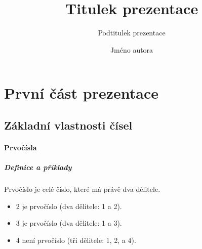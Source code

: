 \documentclass[color]{fithesis3}
\title{Titulek prezentace}
\subtitle{Podtitulek prezentace}
\author{Jméno autora}
\let\subsection\section
\let\section\chapter
\let\tableofcontents\relax}
\begin{document}
    \frame{\maketitle}
    \frame{\tableofcontents}

    \section{První část prezentace}
    \subsection{Základní vlastnosti čísel}
    \begin{frame}
        \frametitle{Prvočísla}
        \framesubtitle{Definice a příklady}
        
        \begin{definition}
            \alert{Prvočíslo} je celé číslo, které má právě dva dělitele.
        \end{definition}
        \begin{example}
            \begin{itemize}
                \item 2 je prvočíslo (dva dělitele: 1 a 2).
                \item 3 je prvočíslo (dva dělitele: 1 a 3).
                \item 4 není prvočíslo (\alert{tři} dělitele: 1, 2, a 4).
            \end{itemize}
        \end{example}
    \end{frame}
\end{document}
